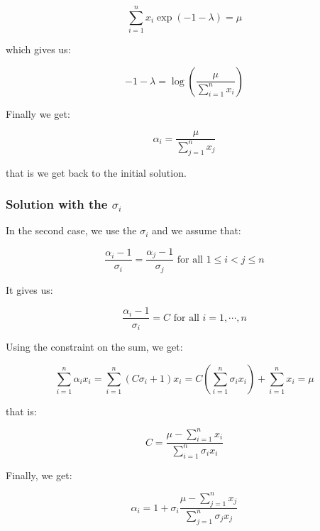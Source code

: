 \begin{equation*}
\sum_{i = 1}^n x_i \exp \left( - 1 - \lambda \right) = \mu
\end{equation*}

which gives us:

\begin{equation*}
- 1 - \lambda = \log \left( \frac{\mu}{\sum_{i = 1}^n x_i} \right)
\end{equation*}

Finally we get:

\begin{equation*}
\alpha_i = \frac{\mu}{\sum_{j = 1}^n x_j}
\end{equation*}

that is we get back to the initial solution.

\subsubsection{Solution with the $\sigma_i$}

In the second case, we use the $\sigma_i$ and we assume that:

\begin{equation*}
\frac{\alpha_i - 1}{\sigma_i} = \frac{\alpha_j - 1}{\sigma_j} \text{ for all } 1 \leq i < j \leq n
\end{equation*}

It gives us:

\begin{equation*}
\frac{\alpha_i - 1}{\sigma_i} = C \text{ for all } i = 1 , \cdots , n
\end{equation*}

Using the constraint on the sum, we get:

\begin{equation*}
\sum_{i = 1}^n \alpha_i x_i = \sum_{i = 1}^n \left( C \sigma_i + 1 \right) x_i = C \left( \sum_{i = 1}^n \sigma_i x_i \right) + \sum_{i = 1}^n x_i = \mu
\end{equation*}

that is:

\begin{equation*}
C = \frac{\mu - \sum_{i = 1}^n x_i}{\sum_{i = 1}^n \sigma_i x_i}
\end{equation*}

Finally, we get:

\begin{equation*}
\alpha_i = 1 + \sigma_i \frac{\mu - \sum_{j = 1}^n x_j}{\sum_{j = 1}^n \sigma_j x_j}
\end{equation*}

